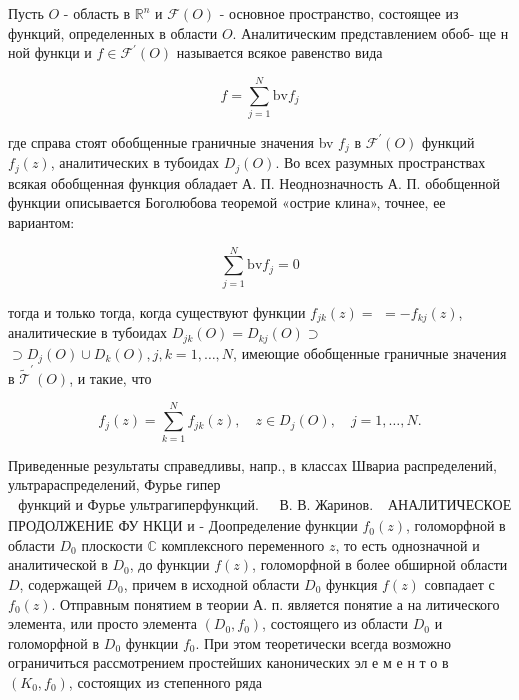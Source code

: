 \documentclass[10pt]{article}
\begin{document}
Пусть $O$ - область в $\mathbb{R}^{n}$ и $\mathscr{\mathscr { F }}(O)$ - основное пространство, состоящее из функций, определенных в области $O$. Аналитическим представлением обоб- ще н ной функци и $f \in \mathscr{F}^{\prime}(O)$ называется всякое равенство вида



\[

f=\sum_{j=1}^{N} \mathrm{bv} f_{j}

\]



где справа стоят обобщенные граничные значения bv $f_{j}$ в $\mathscr{F}^{\prime}(O)$ функций $f_{j}(z)$, аналитических в тубоидах $D_{j}(O)$. Во всех разумных пространствах всякая обобщенная функция обладает А. П. Неоднозначность А. П. обобщенной функции описывается Боголюбова теоремой «острие клина», точнее, ее вариантом:



\[

\sum_{j=1}^{N} \mathrm{bv} f_{j}=0

\]



тогда и только тогда, когда существуют функции $f_{j k}(z)=$ $=-f_{k j}(z)$, аналитические в тубоидах $D_{j k}(O)=D_{k j}(O) \supset$ $\supset D_{j}(O) \cup D_{k}(O), j, k=1, \ldots, N$, имеющие обобщенные граничные значения в $\widetilde{\mathscr{T}}^{\prime}(O)$, и такие, что



\[

f_{j}(z)=\sum_{k=1}^{N} f_{j k}(z), \quad z \in D_{j}(O), \quad j=1, \ldots, N .

\]



Приведенные результаты справедливы, напр., в классах Швариа распределений, ультрараспределений, Фурье гипер$\begin{array}{ll}\text { функций и Фурье ультрагиперфункций. } & \text { В. В. Жаринов. }\end{array}$ АНАЛИТИЧЕСКОЕ ПРОДОЛЖЕНИЕ ФУ НКЦИ и - Доопределение функции $f_{0}(z)$, голоморфной в области $D_{0}$ плоскости $\mathbb{C}$ комплексного переменного $z$, то есть однозначной и аналитической в $D_{0}$, до функции $f(z)$, голоморфной в более обширной области $D$, содержащей $D_{0}$, причем в исходной области $D_{0}$ функция $f(z)$ совпадает с $f_{0}(z)$. Отправным понятием в теории А. п. является понятие а на литического элемента, или просто элемента $\left(D_{0}, f_{0}\right)$, состоящего из области $D_{0}$ и голоморфной в $D_{0}$ функции $f_{0}$. При этом теоретически всегда возможно ограничиться рассмотрением простейших канонических эл е м е н т о в $\left(K_{0}, f_{0}\right)$, состоящих из степенного ряда
\end{document}
